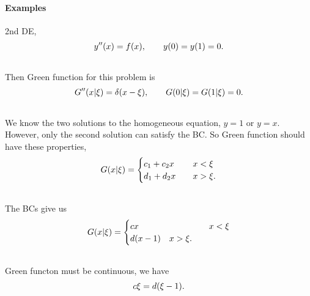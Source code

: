 \documentclass[letterpaper,10pt,english]{sphinxmanual}
\begin{document}
\paragraph{Examples}
\label{vocabulary/green:examples}
2nd DE,
\begin{gather}
\begin{split}y''(x) = f(x), \qquad y(0)= y(1)=0.\end{split}\notag\\\begin{split}\end{split}\notag
\end{gather}
Then Green function for this problem is
\begin{gather}
\begin{split}G''(x\vert \xi) = \delta(x-\xi), \qquad G(0\vert \xi) = G(1\vert \xi) = 0.\end{split}\notag\\\begin{split}\end{split}\notag
\end{gather}
We know the two solutions to the homogeneous equation, $y=1$ or $y=x$. However, only the second solution can satisfy the BC. So Green function should have these properties,
\begin{gather}
\begin{split}G(x\vert \xi) = \begin{cases} c_1+c_2 x &\quad  x<\xi \\ d_1+d_2 x & \quad x>\xi .  \end{cases}\end{split}\notag\\\begin{split}\end{split}\notag
\end{gather}
The BCs give us
\begin{gather}
\begin{split}G(x\vert \xi) = \begin{cases} c x &\quad  x<\xi \\ d(x-1) \quad x>\xi . \end{cases}\end{split}\notag\\\begin{split}\end{split}\notag
\end{gather}
Green functon must be continuous, we have
\begin{gather}
\begin{split}c\xi = d (\xi -1).\end{split}\notag\\\begin{split}\end{split}\notag
\end{gather}
\end{document}
